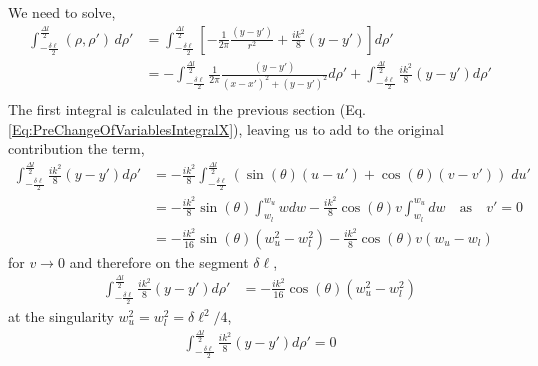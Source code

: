 \documentclass{article}
\newcommand{\0}{\varnothing}
\begin{document}
We need to solve,
\begin{align*}
    \int_{-\frac{\delta \ell}{2}}^{\frac{\Delta l}{2}} (\rho,\rho')\, d\rho' &= 
    \int_{-\frac{\delta \ell}{2}}^{\frac{\Delta l}{2}} \left[ -\frac{1}{2 \pi } \frac{(y-y')}{r^2} + \frac{ik^2}{8}(y-y') \right] d\rho'\\
    &=   -\int_{-\frac{\delta \ell}{2}}^{\frac{\Delta l}{2}} \frac{1}{2 \pi } \frac{(y-y')}{(x-x')^2+(y-y')^2} d\rho' + \int_{-\frac{\delta \ell}{2}}^{\frac{\Delta l}{2}} \frac{ik^2}{8}(y-y')  d\rho'\\
\end{align*}
The first integral is calculated in the previous section (Eq. \eqref{Eq:PreChangeOfVariablesIntegralX}), leaving us to add to the original contribution the term,
\begin{align*}
    \int_{-\frac{\delta \ell}{2}}^{\frac{\Delta l}{2}} \frac{ik^2}{8}(y-y')  d\rho' 
    &= -\frac{ik^2}{8} \int_{-\frac{\delta \ell}{2}}^{\frac{\Delta l}{2}} \left( \sin(\theta)(u-u') + \cos(\theta)(v-v') \right) \; du'\\    
    &= -\frac{ik^2}{8} \sin(\theta)\int_{w_l}^{w_u}  w dw - \frac{ik^2}{8} \cos(\theta)v \int_{w_l}^{w_u} dw \quad \text{as} \quad v' = 0 \\\textbf{}
    &= -\frac{ik^2}{16} \sin(\theta) \left( w_u^2 - w^2_l \right) - \frac{ik^2}{8} \cos(\theta)v (w_u-w_l)
\end{align*}
for $v \rightarrow 0$ and therefore on the segment $\delta \ell$,
\begin{align*}
    \int_{-\frac{\delta \ell}{2}}^{\frac{\Delta l}{2}} \frac{ik^2}{8}(y-y')  d\rho'  &= -\frac{ik^2}{16} \cos(\theta) \left( w_u^2 - w^2_l \right)
\end{align*}
at the singularity $w^2_u = w^2_l = \delta \ell^2/4$,
\begin{align*}
    \int_{-\frac{\delta \ell}{2}}^{\frac{\Delta l}{2}} \frac{ik^2}{8}(y-y')  d\rho' = 0
\end{align*}
\end{document}
